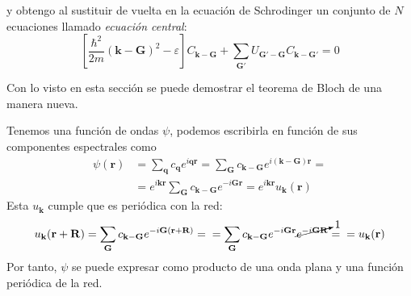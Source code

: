 y obtengo al sustituir de vuelta en la ecuación de Schrodinger un
conjunto de $N$ ecuaciones llamado \emph{ecuación central}:
\begin{equation}
  \boxed{
    \left[ \frac{\hbar^2}{2m} (\mathbf{k}-\mathbf{G})^2 - \varepsilon
    \right] C_{\mathbf{k}-\mathbf{G}} + \sum_{\mathbf{G'}}
    U_{\mathbf{G'}-\mathbf{G}} C_{\mathbf{k}-\mathbf{G'}} = 0
}
\end{equation}


Con lo visto en esta sección se puede demostrar el teorema de Bloch de
una manera nueva.

\begin{boldproof}
  Tenemos una función de ondas $\psi$, podemos escribirla en función
  de sus componentes espectrales como
\begin{equation}
  \begin{split}
  \psi (\mathbf{r}) &= \sum_{\mathbf{q}} c_\mathbf{q}e^{i \mathbf{q}
    \mathbf{r}} = \sum_{\mathbf{G}} c_{\mathbf{k}-\mathbf{G}} e^{i
    (\mathbf{k} - \mathbf{G})\mathbf{r}} = \\
  &= e^{i \mathbf{k}\mathbf{r}}\sum_{\mathbf{G}} c_{\mathbf{k}-
    \mathbf{G}} e^{-i \mathbf{G}\mathbf{r}} = e^{i
    \mathbf{k}\mathbf{r}} u_\mathbf{k}(\mathbf{r})
  \end{split}
\end{equation}
  Esta $u_\mathbf{k}$ cumple que es periódica con la red:
\begin{equation}
  u_\mathbf{k}(\mathbf{r}+\mathbf{R}) = \sum_{\mathbf{G}}
  c_{\mathbf{k}-\mathbf{G}} e^{-i \mathbf{G}(\mathbf{r}+\mathbf{R})}=
  \\ = \sum_{\mathbf{G}}
  c_{\mathbf{k}-\mathbf{G}} e^{-i \mathbf{G}\mathbf{r}}
  \cancelto{1}{e^{-i \mathbf{G} \mathbf{R}}}= \\
  = u_\mathbf{k}(\mathbf{r})
\end{equation}
Por tanto, $\psi$ se puede expresar como producto de una onda plana y
una función periódica de la red.
\end{boldproof}

